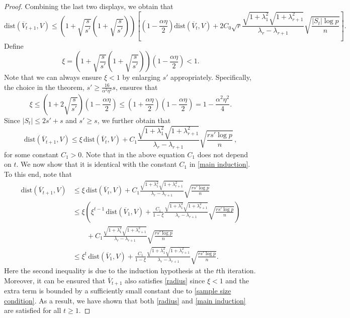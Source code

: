 \documentclass[11pt]{article}
\newcommand{\nb}[1]{\textcolor{orange}{\texttt{[#1]}}}
\newcommand{\hs}{s'}
\newcommand{\scale}{V}
\newcommand{\gd}{\overline{V}}
\newcommand{\0}{{\mathbf{0}}}
\begin{document}
\begin{proof}
Combining the last two displays, we obtain that \begin{equation*}
    \mathrm{dist}(\gd_{t+1},\scale)\leq \left(1+\sqrt{\frac{s}{\hs}}\left(1+\sqrt{\frac{s}{\hs}}\right)\right)\left[\left(1-\frac{\alpha\eta}{2} \right)\mathrm{dist}(\gd_t,\scale)+2C_0\sqrt{r}\frac{\sqrt{1+\lambda_1^2}\sqrt{{1+\lambda_{r+1}^2}}}{\lambda_r-\lambda_{r+1}}\sqrt{\frac{|S_t|\log p}{n}}\right].
\end{equation*}
Define \begin{equation*}
    \xi= \left(1+\sqrt{\frac{s}{\hs}}\left(1+\sqrt{\frac{s}{\hs}}\right)\right)\left(1-\frac{\alpha\eta}{2} \right)<1.
\end{equation*}
Note that we can always ensure $\xi< 1$ by enlarging $\hs$ appropriately.
Specifically, the choice in the theorem, $s' \geq \frac{16}{\alpha^2\eta^2}s$, ensures that 
\begin{equation}
\label{eq:condition_s_prime}
      \xi \leq\left(1+2\sqrt{\frac{s}{\hs}}\right)\left(1-\frac{\alpha\eta}{2} \right) \leq \left(1+\frac{\alpha\eta}{2}\right) \left(1-\frac{\alpha\eta}{2}\right)= 1-\frac{\alpha^2\eta^2}{4}.
\end{equation} 
Since $|S_t| \leq 2s'+s$ and $s'\ge s$, we further obtain that 
\begin{equation*}
\mathrm{dist}(\gd_{t+1},\scale)
\leq\xi\,\mathrm{dist}(\gd_t,\scale)+C_1\frac{\sqrt{1+\lambda_1^2}\sqrt{{1+\lambda_{r+1}^2}}}{\lambda_r-\lambda_{r+1}}\sqrt{\frac{rs'\log p}{n}}\,,
\end{equation*}
for some constant $C_1 > 0$. 
Note that in the above equation $C_1$ does not depend on $t$. 
We now show that it is identical with the constant $C_1$ in \eqref{main induction}. 
To this end, note that 
\begin{align*}
\mathrm{dist}(\gd_{t+1},\scale)
&\leq\xi\,\mathrm{dist}(\gd_t,\scale)+C_1\frac{\sqrt{1+\lambda_1^2}\sqrt{{1+\lambda_{r+1}^2}}}{\lambda_r-\lambda_{r+1}}\sqrt{\frac{rs'\log p}{n}}\\
&\leq \xi \left(\xi^{t-1}\,\mathrm{dist}(\gd_1,\scale)
+\frac{C_1}{1-\xi}
\frac{\sqrt{1+\lambda_1^2}\sqrt{{1+\lambda_{r+1}^2}}}{\lambda_r-\lambda_{r+1}}\sqrt{\frac{rs'\log p}{n}} \right)\\
& \qquad +C_1\frac{\sqrt{1+\lambda_1^2}\sqrt{{1+\lambda_{r+1}^2}}}{\lambda_r-\lambda_{r+1}}\sqrt{\frac{rs'\log p}{n}}\\
&\leq \xi^{t}\,\mathrm{dist}(\gd_1,\scale)
+\frac{C_1}{1-\xi}
\frac{\sqrt{1+\lambda_1^2}\sqrt{{1+\lambda_{r+1}^2}}}{\lambda_r-\lambda_{r+1}}\sqrt{\frac{rs'\log p}{n}}.
\end{align*}
Here the second inequality is due to the induction hypothesis at the $t$th iteration.
Moreover, it can be ensured that $\gd_{t+1}$ also satisfies \eqref{radius} since $\xi<1$ and the extra term is bounded by a sufficiently small constant due to \eqref{sample size condition}. 
As a result, we have shown that both \eqref{radius} and \eqref{main induction} are satisfied for all $t\geq 1$.



\end{proof}
\end{document}

